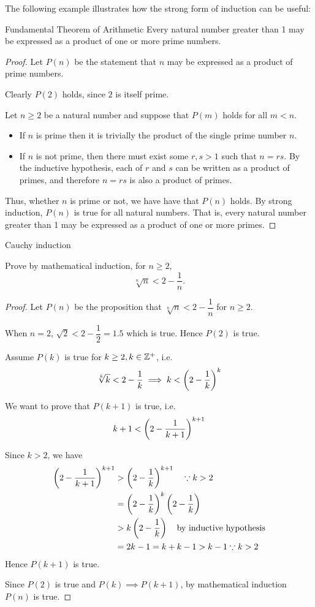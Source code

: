The following example illustrates how the strong form of induction can be useful:

\begin{exmp}{Fundamental Theorem of Arithmetic}{}
Every natural number greater than 1 may be expressed as a product of one or more prime numbers.
\end{exmp}

\begin{proof}
Let $P(n)$ be the statement that $n$ may be expressed as a product of prime numbers. 

Clearly $P(2)$ holds, since $2$ is itself prime. 

Let $n \ge 2$ be a natural number and suppose that $P(m)$ holds for all $m<n$.

\begin{itemize}
\item If $n$ is prime then it is trivially the product of the single prime number $n$. 

\item If $n$ is not prime, then there must exist some $r, s > 1$ such that $n = rs$. By the inductive hypothesis, each of $r$ and $s$ can be written as a product of primes, and therefore $n = rs$ is also a product of primes.
\end{itemize}

Thus, whether $n$ is prime or not, we have have that $P(n)$ holds. By strong induction, $P(n)$ is true for all natural numbers. That is, every natural number greater than 1 may be expressed as a product of one or more primes.
\end{proof}

Cauchy induction
\pagebreak

\begin{prbm}[FM/TJC/2023]
Prove by mathematical induction, for $n \ge 2$,
\[ \sqrt[n]{n}<2 - \frac{1}{n}. \]
\end{prbm}

\begin{proof}
Let $P(n)$ be the proposition that $\sqrt[n]{n}<2 - \dfrac{1}{n}$ for $n \ge 2$.

When $n=2$, $\sqrt{2} <2-\dfrac{1}{2}=1.5$ which is true. Hence $P(2)$ is true.

Assume $P(k)$ is true for $k \ge 2, k \in \mathbb Z^+$, i.e.
\[ \sqrt[k]{k}<2 - \dfrac{1}{k} \implies k<\left(2-\frac{1}{k}\right)^k \]

We want to prove that $P(k+1)$ is true, i.e.
\[ k+1<\left(2-\frac{1}{k+1}\right)^{k+1} \]

Since $k>2$, we have 
\begin{align*}
\left(2-\frac{1}{k+1}\right)^{k+1}
&> \left(2-\frac{1}{k}\right)^{k+1} \quad \because k>2 \\
&= \left(2-\frac{1}{k}\right)^k\left(2-\frac{1}{k}\right) \\
&> k\left(2-\frac{1}{k}\right) \quad \text{by inductive hypothesis} \\
&= 2k-1 = k+k-1 > k-1 \because k>2
\end{align*}
Hence $P(k+1)$ is true.

Since $P(2)$ is true and $P(k)\implies P(k+1)$, by mathematical induction $P(n)$ is true.
\end{proof}
\pagebreak

